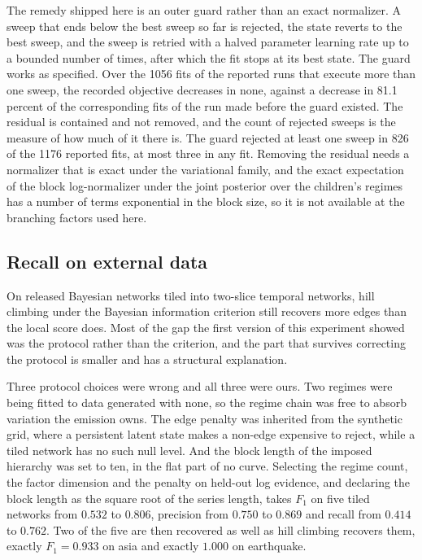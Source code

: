 The remedy shipped here is an outer guard rather than an exact normalizer. A
sweep that ends below the best sweep so far is rejected, the state reverts to the
best sweep, and the sweep is retried with a halved parameter learning rate up to
a bounded number of times, after which the fit stops at its best state. The guard
works as specified. Over the 1056 fits of the reported runs that execute more
than one sweep, the recorded objective decreases in none, against a decrease in
81.1 percent of the corresponding fits of the run made before the guard existed.
The residual is contained and not removed, and the count of rejected sweeps is
the measure of how much of it there is. The guard rejected at least one sweep in
826 of the 1176 reported fits, at most three in any fit. Removing the residual
needs a normalizer that is exact under the variational family, and the exact
expectation of the block log-normalizer under the joint posterior over the
children's regimes has a number of terms exponential in the block size, so it is
not available at the branching factors used here.

\subsection{Recall on external data}
\label{sec:lim_recall}

On released Bayesian networks tiled into two-slice temporal networks, hill
climbing under the Bayesian information criterion still recovers more edges than
the local score does. Most of the gap the first version of this experiment
showed was the protocol rather than the criterion, and the part that survives
correcting the protocol is smaller and has a structural explanation.

Three protocol choices were wrong and all three were ours. Two regimes were
being fitted to data generated with none, so the regime chain was free to absorb
variation the emission owns. The edge penalty was inherited from the synthetic
grid, where a persistent latent state makes a non-edge expensive to reject,
while a tiled network has no such null level. And the block length of the
imposed hierarchy was set to ten, in the flat part of no curve. Selecting the
regime count, the factor dimension and the penalty on held-out log evidence, and
declaring the block length as the square root of the series length, takes $F_1$
on five tiled networks from $0.532$ to $0.806$, precision from $0.750$ to
$0.869$ and recall from $0.414$ to $0.762$. Two of the five are then recovered
as well as hill climbing recovers them, exactly $F_1 = 0.933$ on asia and
exactly $1.000$ on earthquake.

